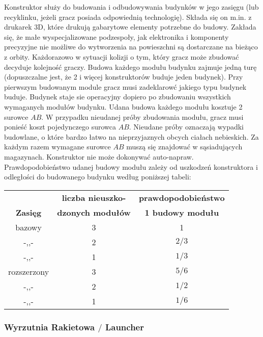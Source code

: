 \documentclass[11pt,a4paper]{article}
\begin{document}
Konstruktor służy do budowania i odbudowywania budynków w jego zasięgu (lub recyklinku, jeżeli gracz posiada odpowiednią technologię). Składa się on m.in. z drukarek 3D, które drukują gabarytowe elementy potrzebne do budowy. Zakłada się, że małe wyspecjalizowane podzespoły, jak elektronika i komponenty precyzyjne nie możliwe do wytworzenia na powieszchni są dostarczane na bieżąco z orbity. Każdorazowo w sytuacji kolizji o tym, który gracz może zbudować decyduje kolejność graczy. Budowa każdego modułu budynku zajmuje jedną turę (dopuszczalne jest, że 2 i więcej konstruktorów buduje jeden budynek). Przy pierwszym budowanym module gracz musi zadeklarowć jakiego typu budynek buduje. Budynek staje sie operacyjny dopiero po zbudowaniu wszystkich wymaganych modułów budynku. Udana budowa każdego modułu kosztuje 2 surowce $AB$. W przypadku nieudanej próby zbudowania modułu, gracz musi ponieść koszt pojedynczego surowca $AB$. Nieudane próby oznaczają wypadki budowlane, o które bardzo łatwo na nieprzyjaznych obcych ciałach nebieskich. Za każdym razem wymagane surowce $AB$ muszą się znajdować w sąsiadujących magazynach. Konstruktor nie może dokonywać auto-napraw. Prawdopodobieństwo udanej budowy modułu zależy od uszkodzeń konstruktora i odległości do budowanego budynku według poniższej tabeli:
\begin{center}
  \begin{tabular}{| c | c | c |}
    \hline
     & \textbf{liczba nieuszko-} & \textbf{prawdopodobieństwo}\\
    \textbf{Zasięg} & \textbf{dzonych modułów} & \textbf{1 budowy modułu}\\
    \hline
     bazowy & 3 & 1 \\
    \hline
    -,,-  & 2 & $2/3$ \\
    \hline
    -,,- & 1 & $1/3$ \\
    \hline
    rozszerzony & 3 & $5/6$ \\
    \hline
    -,,- & 2 & $1/2$ \\
    \hline
    -,,- & 1 & $1/6$ \\
    \hline
  \end{tabular}
\end{center}

\subsubsection{Wyrzutnia Rakietowa $/$ Launcher}
\end{document}
